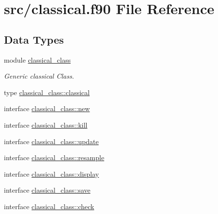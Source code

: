 \hypertarget{classical_8f90}{\section{src/classical.f90 File Reference}
\label{classical_8f90}
}
\subsection*{Data Types}
\begin{DoxyCompactItemize}
\item 
module \hyperlink{classclassical__class}{classical\-\_\-class}
\begin{DoxyCompactList}\small\item\em Generic classical Class. \end{DoxyCompactList}\item 
type \hyperlink{structclassical__class_1_1classical}{classical\-\_\-class\-::classical}
\item 
interface \hyperlink{interfaceclassical__class_1_1new}{classical\-\_\-class\-::new}
\item 
interface \hyperlink{interfaceclassical__class_1_1kill}{classical\-\_\-class\-::kill}
\item 
interface \hyperlink{interfaceclassical__class_1_1update}{classical\-\_\-class\-::update}
\item 
interface \hyperlink{interfaceclassical__class_1_1resample}{classical\-\_\-class\-::resample}
\item 
interface \hyperlink{interfaceclassical__class_1_1display}{classical\-\_\-class\-::display}
\item 
interface \hyperlink{interfaceclassical__class_1_1save}{classical\-\_\-class\-::save}
\item 
interface \hyperlink{interfaceclassical__class_1_1check}{classical\-\_\-class\-::check}
\end{DoxyCompactItemize}
